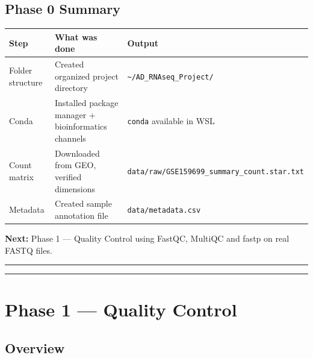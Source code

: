 \documentclass[
]{article}
\begin{document}
\subsection{Phase 0 Summary}\label{phase-0-summary}

\begin{longtable}[]{@{}
  >{\raggedright\arraybackslash}p{}
  >{\raggedright\arraybackslash}p{}
  >{\raggedright\arraybackslash}p{}@{}}
\toprule\noalign{}
\begin{minipage}[b]{\linewidth}\raggedright
Step
\end{minipage} & \begin{minipage}[b]{\linewidth}\raggedright
What was done
\end{minipage} & \begin{minipage}[b]{\linewidth}\raggedright
Output
\end{minipage} \\
\midrule\noalign{}
\endhead
\bottomrule\noalign{}
\endlastfoot
Folder structure & Created organized project directory &
\texttt{\textasciitilde{}/AD\_RNAseq\_Project/} \\
Conda & Installed package manager + bioinformatics channels &
\texttt{conda} available in WSL \\
Count matrix & Downloaded from GEO, verified dimensions &
\texttt{data/raw/GSE159699\_summary\_count.star.txt} \\
Metadata & Created sample annotation file &
\texttt{data/metadata.csv} \\
\end{longtable}

\textbf{Next:} Phase 1 --- Quality Control using FastQC, MultiQC and
fastp on real FASTQ files.

\begin{center}\rule{0.5\linewidth}{0.5pt}\end{center}

\begin{center}\rule{0.5\linewidth}{0.5pt}\end{center}

\section{Phase 1 --- Quality Control}\label{phase-1-quality-control}

\subsection{Overview}\label{overview}
\end{document}
